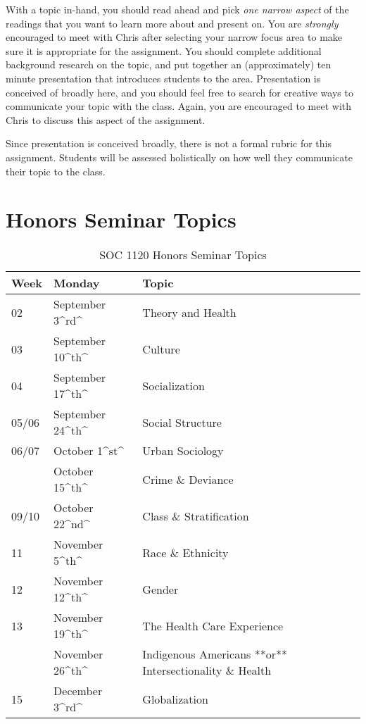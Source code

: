 \documentclass[]{book}
\theoremstyle{definition}
\theoremstyle{definition}
\theoremstyle{definition}
\theoremstyle{remark}
\begin{document}
With a topic in-hand, you should read ahead and pick \emph{one narrow
aspect} of the readings that you want to learn more about and present
on. You are \emph{strongly} encouraged to meet with Chris after
selecting your narrow focus area to make sure it is appropriate for the
assignment. You should complete additional background research on the
topic, and put together an (approximately) ten minute presentation that
introduces students to the area. Presentation is conceived of broadly
here, and you should feel free to search for creative ways to
communicate your topic with the class. Again, you are encouraged to meet
with Chris to discuss this aspect of the assignment.

Since presentation is conceived broadly, there is not a formal rubric
for this assignment. Students will be assessed holistically on how well
they communicate their topic to the class.

\hypertarget{honors-seminar-topics}{%
\section{Honors Seminar Topics}\label{honors-seminar-topics}}

\begin{table}

\caption{\label{tab:unnamed-chunk-4}SOC 1120 Honors Seminar Topics}
\centering
\begin{tabular}[t]{lll}
\toprule
Week & Monday & Topic\\
\midrule
02 & September 3\textasciicircum{}rd\textasciicircum{} & Theory and Health\\
03 & September 10\textasciicircum{}th\textasciicircum{} & Culture\\
04 & September 17\textasciicircum{}th\textasciicircum{} & Socialization\\
05/06 & September 24\textasciicircum{}th\textasciicircum{} & Social Structure\\
06/07 & October 1\textasciicircum{}st\textasciicircum{} & Urban Sociology\\
\addlinespace
08 & October 15\textasciicircum{}th\textasciicircum{} & Crime \& Deviance\\
09/10 & October 22\textasciicircum{}nd\textasciicircum{} & Class \& Stratification\\
11 & November 5\textasciicircum{}th\textasciicircum{} & Race \& Ethnicity\\
12 & November 12\textasciicircum{}th\textasciicircum{} & Gender\\
13 & November 19\textasciicircum{}th\textasciicircum{} & The Health Care Experience\\
\addlinespace
14 & November 26\textasciicircum{}th\textasciicircum{} & Indigenous Americans **or** Intersectionality \& Health\\
15 & December 3\textasciicircum{}rd\textasciicircum{} & Globalization\\
\bottomrule
\end{tabular}
\end{table}
\end{document}
